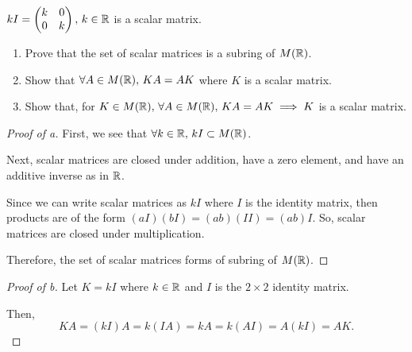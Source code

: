 \documentclass[../hw3]{subfiles}
\begin{document}
\begin{problem}
$kI = \begin{pmatrix} k & 0 \\ 0 & k \end{pmatrix} ,\, k\in \mathbb{R}$ is a scalar matrix.
\begin{enumerate}[label=\alph*)]
	\item Prove that the set of scalar matrices is a subring of $M(\mathbb{R})$.
	\item Show that $\forall A\in M(\mathbb{R}),\, KA=AK$ where $K$ is a scalar matrix.
	\item  Show that, for $K\in M(\mathbb{R}),\, \forall A\in M(\mathbb{R}),\, KA=AK \implies K$ is a scalar matrix.
\end{enumerate}
\end{problem}
\begin{proof}[Proof of a]
	First, we see that $\forall k\in \mathbb{R},\,  kI \subset M(\mathbb{R})$.

	Next, scalar matrices are closed under addition, have a zero element, and have an additive inverse as in $\mathbb{R}$.

	Since we can write scalar matrices as $kI$ where  $I$ is the identity matrix, then products are of the form  $(aI)(bI)=(ab)(II)=(ab)I$.
	So, scalar matrices are closed under multiplication.

	Therefore, the set of scalar matrices forms of subring of $M(\mathbb{R})$.
\end{proof}

\begin{proof}[Proof of b]
	Let $K=kI$ where  $k\in \mathbb{R}$ and $I$ is the $2\times 2$ identity matrix.

	Then, \[
		KA=(kI)A = k(IA) = kA = k(AI) = A(kI) = AK
		.\]
\end{proof}
\end{document}
